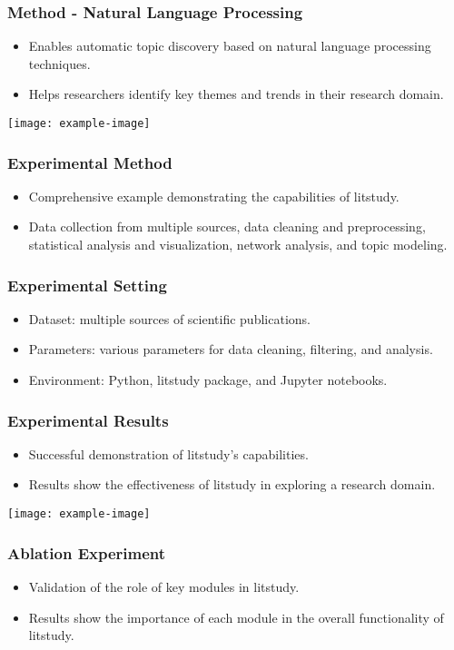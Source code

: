 \documentclass{beamer}
\begin{document}
\begin{frame}
\frametitle{Method - Natural Language Processing}
\begin{itemize}
\item Enables automatic topic discovery based on natural language processing techniques.
\item Helps researchers identify key themes and trends in their research domain.
\end{itemize}
\texttt{[image: example-image]}
\end{frame}

\begin{frame}
\frametitle{Experimental Method}
\begin{itemize}
\item Comprehensive example demonstrating the capabilities of litstudy.
\item Data collection from multiple sources, data cleaning and preprocessing, statistical analysis and visualization, network analysis, and topic modeling.
\end{itemize}
\end{frame}

\begin{frame}
\frametitle{Experimental Setting}
\begin{itemize}
\item Dataset: multiple sources of scientific publications.
\item Parameters: various parameters for data cleaning, filtering, and analysis.
\item Environment: Python, litstudy package, and Jupyter notebooks.
\end{itemize}
\end{frame}

\begin{frame}
\frametitle{Experimental Results}
\begin{itemize}
\item Successful demonstration of litstudy's capabilities.
\item Results show the effectiveness of litstudy in exploring a research domain.
\end{itemize}
\texttt{[image: example-image]}
\end{frame}

\begin{frame}
\frametitle{Ablation Experiment}
\begin{itemize}
\item Validation of the role of key modules in litstudy.
\item Results show the importance of each module in the overall functionality of litstudy.
\end{itemize}
\end{frame}
\end{document}
